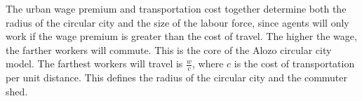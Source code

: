 

The {urban wage premium} and transportation cost together determine both the radius of the circular city and the size of the labour force, %
since agents will only work if the wage premium is greater than the cost of travel. %
The higher the wage, the  farther workers will commute. This is the core of the Alozo circular city model. The farthest workers will travel  is $\frac{w}{{c}}$, where ${c}$ is the cost of transportation per unit distance. This defines the radius of the circular city and the commuter shed.

